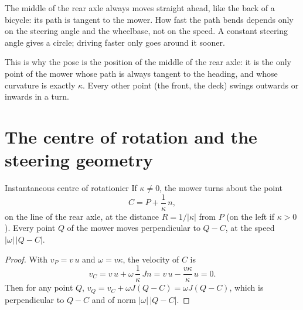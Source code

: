 \begin{inwords}
  The middle of the rear axle always moves straight ahead, like the back of
  a bicycle: its path is tangent to the mower. How fast the path bends
  depends only on the steering angle and the wheelbase, not on the speed. A
  constant steering angle gives a circle; driving faster only goes around it
  sooner.
\end{inwords}

This is why the pose is the position of the middle of the rear axle: it is
the only point of the mower whose path is always tangent to the heading, and
whose curvature is exactly $\kappa$. Every other point (the front, the deck)
swings outwards or inwards in a turn.

\section{The centre of rotation and the steering geometry}
\label{sec:ackermann}

\begin{proposition}{Instantaneous centre of rotation}{icr}
  If $\kappa \neq 0$, the mower turns about the point
  \[
    C = P + \frac1\kappa\, n,
  \]
  on the line of the rear axle, at the distance $R = 1/|\kappa|$ from $P$
  (on the left if $\kappa > 0$). Every point $Q$ of the mower moves
  perpendicular to $Q - C$, at the speed $|\omega|\,|Q - C|$.
\end{proposition}

\begin{proof}
  With $v_P = v\,u$ and $\omega = v\kappa$, the velocity of $C$ is
  \[
    v_C = v\,u + \omega\,\frac1\kappa\, J n = v\,u - \frac{v\kappa}{\kappa}\,u
    = 0 .
  \]
  Then for any point $Q$, $v_Q = v_C + \omega J(Q - C) = \omega J(Q - C)$,
  which is perpendicular to $Q - C$ and of norm $|\omega|\,|Q - C|$.
\end{proof}

